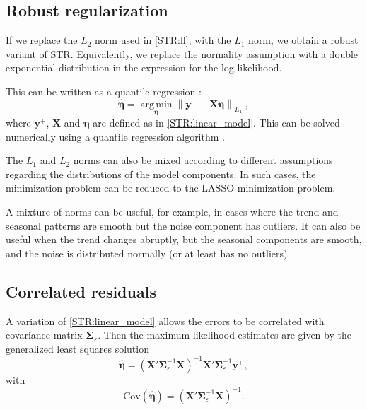 \documentclass[11pt,a4paper,]{article}
\begin{document}
\hypertarget{robust-regularization}{%
\subsection{Robust regularization}\label{robust-regularization}}

If we replace the \(L_2\) norm used in \eqref{STR:ll}, with the \(L_1\) norm, we obtain a robust variant of STR. Equivalently, we replace the normality assumption with a double exponential distribution in the expression for the log-likelihood.

This can be written as a quantile regression \autocite{koenker2005quantile}:
\begin{equation}
  \label{RSTR:qr}
  \hat{\bm\eta} = \operatorname{arg\,min}\limits_{\bm\eta} \left\|\bm{y}^{+}-\bm{X}\bm{\eta}\right\|_{L_1}\ ,
\end{equation}
where \(\bm{y}^{+}\), \(\bm{X}\) and \(\bm\eta\) are defined as in \eqref{STR:linear_model}. This can be solved numerically using a quantile regression algorithm \autocite{quantregR}.

The \(L_1\) and \(L_2\) norms can also be mixed according to different assumptions regarding the distributions of the model components. In such cases, the minimization problem can be reduced to the LASSO minimization problem.

A mixture of norms can be useful, for example, in cases where the trend and seasonal patterns are smooth but the noise component has outliers. It can also be useful when the trend changes abruptly, but the seasonal components are smooth, and the noise is distributed normally (or at least has no outliers).

\hypertarget{correlated-residuals}{%
\subsection{Correlated residuals}\label{correlated-residuals}}

A variation of \eqref{STR:linear_model} allows the errors to be correlated with covariance matrix \(\bm{\Sigma}_\varepsilon\). Then the maximum likelihood estimates are given by the generalized least squares solution
\begin{equation}
\label{STR:solution_GLS}
\hat{\bm\eta} = (\bm{X}'\bm{\Sigma}_\varepsilon^{-1}\bm{X})^{-1}\bm{X}'\bm{\Sigma}_\varepsilon^{-1} \bm{y}^{+} ,
\end{equation}
with
\begin{equation}
\label{STR:beta_covar_STR}
\text{Cov}(\hat{\bm\eta}) = (\bm{X}'\bm{\Sigma}_\varepsilon^{-1}\bm{X})^{-1} .
\end{equation}
\end{document}
